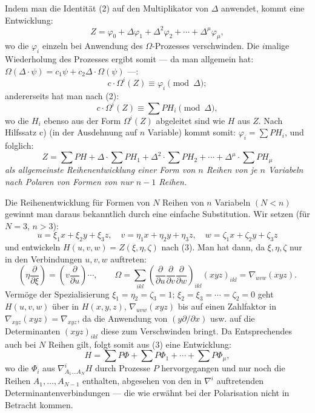 \documentclass[11pt]{article}
\begin{document}
Indem man die Identität (2) auf den Multiplikator von $\Delta$ anwendet, kommt eine Entwicklung:
\[
  Z=\varphi_0+\Delta\varphi_1+\Delta^2\varphi_2+\cdots+\Delta^\mu\varphi_\mu,
\]
wo die $\varphi_i$ einzeln bei Anwendung des $\Omega$-Prozesses verschwinden. Die $i$malige Wiederholung des Prozesses ergibt somit --- da man allgemein hat: $\Omega(\Delta\cdot\psi)=c_1\psi+c_2\Delta\cdot\Omega(\psi)$ ---:
\[
  c\cdot \Omega^i(Z)\equiv\varphi_i\pmod{\Delta};
\]
andererseits hat man nach (2):
\[
  c\cdot\Omega^i(Z)\equiv\sum PH_i\pmod{\Delta},
\]
wo die $H_i$ ebenso aus der Form $\Omega^i(Z)$ abgeleitet sind wie $H$ aus $Z$. Nach Hilfssatz c) (in der Ausdehnung auf $n$ Variable) kommt somit: $\varphi_i=\sum PH_i$, und folglich:
\begin{equation}
  Z=\sum PH+\Delta\cdot\sum PH_1+\Delta^2\cdot\sum PH_2+
  \cdots+\Delta^\mu\cdot\sum PH_\mu
\tag{3}
\end{equation}
\emph{als allgemeinste Reihenentwicklung einer Form von $n$ Reihen von je $n$ Variabeln nach Polaren von Formen von nur $n-1$ Reihen.}

Die Reihenentwicklung für Formen von $N$ Reihen von $n$ Variabeln $(N<n)$ gewinnt man daraus bekanntlich durch eine einfache Substitution. Wir setzen (für $N=3$, $n>3$):
\[
  u=\xi_1x+\xi_2y+\xi_3z,
  \quad v=\eta_1x+\eta_2y+\eta_3z,
  \quad w=\zeta_1x+\zeta_2y+\zeta_3z
\]
und entwickeln $H(u,v,w)=Z(\xi,\eta,\zeta)$ nach (3). Man hat dann, da $\xi,\eta,\zeta$ nur in den Verbindungen $u,v,w$ auftreten:
\[
  \left(\eta\frac{\partial}{\partial \xi}\right)=
  \left(v\frac{\partial}{\partial u}\right)\cdots,
  \qquad
  \Omega=\sum_{ikl}\left(\frac{\partial}{\partial u}
  \frac{\partial}{\partial v}
  \frac{\partial}{\partial w}\right)_{ikl}(xyz)_{ikl}
  =\nabla_{uvw}(xyz).
\]
Vermöge der Spezialisierung $\xi_1=\eta_2=\zeta_3=1$; $\xi_2=\xi_3=\cdots=\zeta_2=0$ geht $H(u,v,w)$ über in $H(x,y,z)$, $\nabla_{uvw}(xyz)$ bis auf einen Zahlfaktor in $\nabla_{xyz}(xyz)=\nabla_{xyz}$, da die Anwendung von $(y\partial/\partial x)$ usw. auf die Determinanten $(xyz)_{ikl}$ diese zum Verschwinden bringt. Da Entsprechendes auch bei $N$ Reihen gilt, folgt somit aus (3) eine Entwicklung:
\begin{equation}
  H=\sum P\Phi+\sum P\Phi_1+\cdots+\sum P\Phi_\mu,
\tag{4}
\end{equation}
wo die $\Phi_i$ aus $\nabla^i_{A_1\ldots A_N}H$ durch Prozesse $P$ hervorgegangen und nur noch die Reihen $A_1,
\ldots,A_{N-1}$ enthalten, abgesehen von den in $\nabla^i$ auftretenden Determinantenverbindungen --- die wie erwähnt bei der Polarisation nicht in Betracht kommen.
\end{document}
